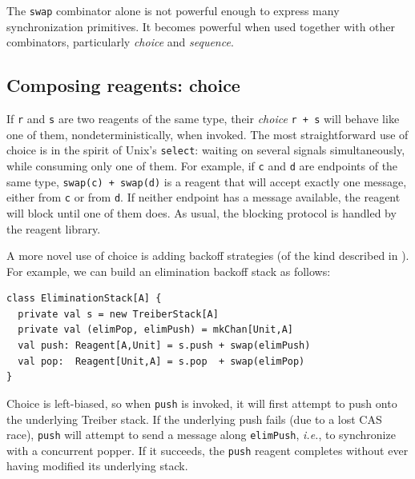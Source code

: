 \documentclass[preprint,nocopyrightspace]{sigplanconf}
\begin{document}
The \lstinline{swap} combinator alone is not powerful enough to
express many synchronization primitives.  It becomes powerful when
used together with other combinators, particularly \emph{choice} and
\emph{sequence}.



\subsection{Composing reagents: choice}
\label{sec:choice}

If \lstinline{r} and \lstinline{s} are two reagents of the same type, their
\emph{choice} \lstinline{r + s} will behave like one of them,
nondeterministically, when invoked.  The most straightforward use of choice is
in the spirit of Unix's \lstinline{select}: waiting on several
signals simultaneously, while consuming only one of them.  For example, if
\lstinline{c} and \lstinline{d} are endpoints of the same type,
\lstinline{swap(c) + swap(d)} is a reagent that will accept exactly one message,
either from \lstinline{c} or from \lstinline{d}.  If neither endpoint has a
message available, the reagent will block until one of them does.  As usual, the
blocking protocol is handled by the reagent library.

A more novel use of choice is adding backoff strategies (of the kind described
in ).  For example, we can build an elimination backoff stack
as follows:
\begin{lstlisting}
class EliminationStack[A] {
  private val s = new TreiberStack[A]
  private val (elimPop, elimPush) = mkChan[Unit,A]
  val push: Reagent[A,Unit] = s.push + swap(elimPush)
  val pop:  Reagent[Unit,A] = s.pop  + swap(elimPop)
}
\end{lstlisting}
Choice is left-biased, so
when \lstinline{push} is invoked, it will first attempt to push onto
the underlying Treiber stack.  If the underlying push fails (due to a
lost CAS race), \lstinline{push} will attempt to send a message along
\lstinline{elimPush}, \emph{i.e.}, to synchronize with a concurrent
popper.  If it succeeds, the \lstinline{push} reagent completes
without ever having modified its underlying stack.
\end{document}
